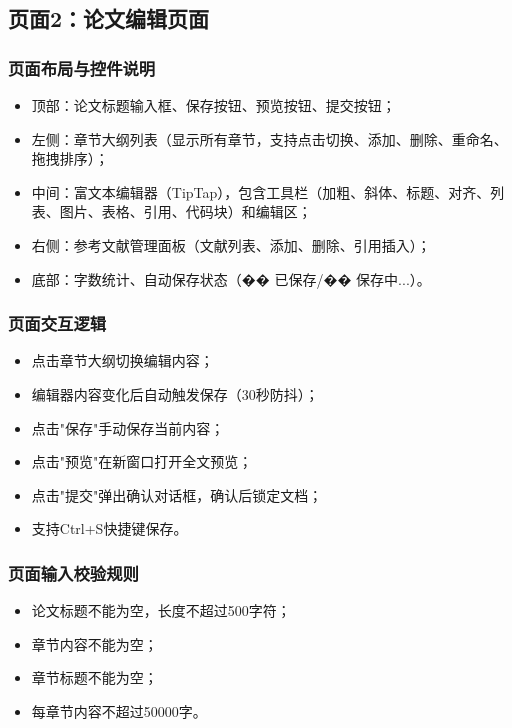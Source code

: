 \documentclass{../template/softeng}
\begin{document}
	\subsection{页面2：论文编辑页面}

	\subsubsection{页面布局与控件说明}
	\begin{itemize}
		\item 顶部：论文标题输入框、保存按钮、预览按钮、提交按钮；
		\item 左侧：章节大纲列表（显示所有章节，支持点击切换、添加、删除、重命名、拖拽排序）；
		\item 中间：富文本编辑器（TipTap），包含工具栏（加粗、斜体、标题、对齐、列表、图片、表格、引用、代码块）和编辑区；
		\item 右侧：参考文献管理面板（文献列表、添加、删除、引用插入）；
		\item 底部：字数统计、自动保存状态（�� 已保存/�� 保存中...）。
	\end{itemize}

	\subsubsection{页面交互逻辑}
	\begin{itemize}
		\item 点击章节大纲切换编辑内容；
		\item 编辑器内容变化后自动触发保存（30秒防抖）；
		\item 点击"保存"手动保存当前内容；
		\item 点击"预览"在新窗口打开全文预览；
		\item 点击"提交"弹出确认对话框，确认后锁定文档；
		\item 支持Ctrl+S快捷键保存。
	\end{itemize}

	\subsubsection{页面输入校验规则}
	\begin{itemize}
		\item 论文标题不能为空，长度不超过500字符；
		\item 章节内容不能为空；
		\item 章节标题不能为空；
		\item 每章节内容不超过50000字。
	\end{itemize}
\end{document}
